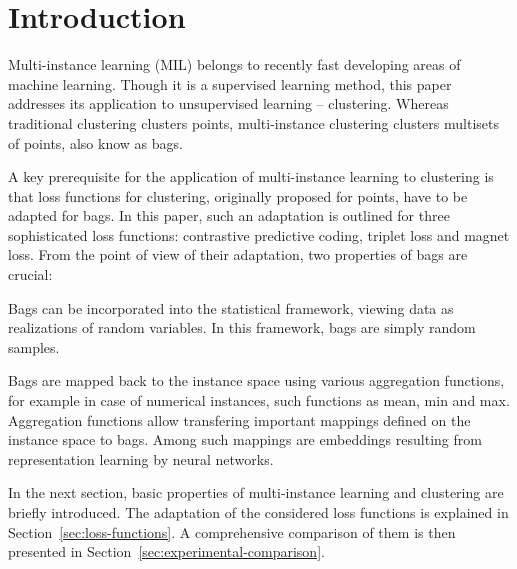 \section{Introduction}

Multi-instance learning (MIL) belongs to recently fast developing areas of machine learning. Though it is a supervised learning method, this paper addresses its application to unsupervised learning -- clustering. Whereas traditional clustering clusters points, multi-instance clustering clusters multisets of points, also know as bags.

A key prerequisite for the application of multi-instance learning to clustering is that loss functions for clustering, originally proposed for points, have to be adapted for bags. In this paper, such an adaptation is outlined for three sophisticated loss functions: contrastive predictive coding, triplet loss and magnet loss. From the point of view of their adaptation, two properties of bags are crucial:
\begin{romanitems}
	\item Bags can be incorporated into the statistical framework, viewing data as realizations of random variables. In this framework, bags are simply random samples.
	\item Bags are mapped back to the instance space using various aggregation functions, for example in case of numerical instances, such functions as mean, min and max. Aggregation functions allow transfering important mappings defined on the instance space to bags. Among such mappings are embeddings resulting from representation learning by neural networks.
\end{romanitems}

In the next section, basic properties of multi-instance learning and clustering are briefly introduced. The adaptation of the considered loss functions is explained in Section~\ref{sec:loss-functions}. A comprehensive comparison of them is then presented in Section~\ref{sec:experimental-comparison}.
